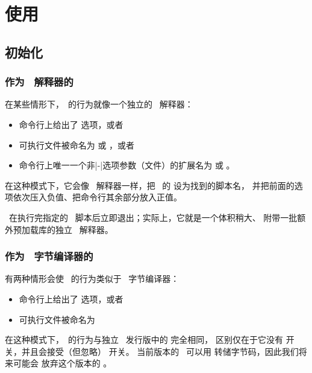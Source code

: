 \chapter{使用 \LUATEX}\label{lua}

\section{初始化}\label{init}

\subsection{作为 \LUA\ 解释器的 \LUATEX}


在某些情形下，\LUATEX\ 的行为就像一个独立的 \LUA\ 解释器：

\begin{itemize}
\item 命令行上给出了  选项，或者

\item 可执行文件被命名为  或 ，或者

\item 命令行上唯一一个非|-|选项参数（文件）的扩展名为  或 。

\end{itemize}

在这种模式下，它会像 \LUA\ 解释器一样，把 \LUA\ 的  设为找到的脚本名，
并把前面的选项依次压入负值、把命令行其余部分放入正值。

\LUATEX\ 在执行完指定的 \LUA\ 脚本后立即退出；实际上，它就是一个体积稍大、
附带一批额外预加载库的独立 \LUA\ 解释器。

\subsection{作为 \LUA\ 字节编译器的 \LUATEX}


有两种情形会使 \LUATEX\ 的行为类似于 \LUA\ 字节编译器：

\begin{itemize}
\item 命令行上给出了  选项，或者 
\item 可执行文件被命名为  
\end{itemize}

在这种模式下，\LUATEX\ 的行为与独立 \LUA\ 发行版中的  完全相同，
区别仅在于它没有  开关，并且会接受（但忽略） 开关。
当前版本的 \LUA\ 可以用  转储字节码，因此我们将来可能会
放弃这个版本的 \LUATEX。


